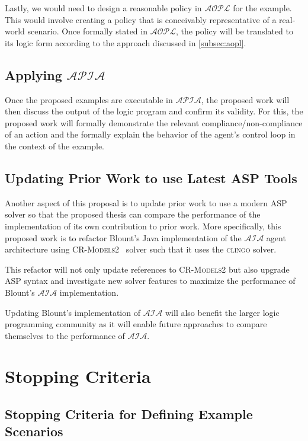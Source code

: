 Lastly, we would need to design a reasonable policy in $\mathcal{AOPL}$ for the example.
This would involve creating a policy that is conceivably representative of a real-world scenario.
Once formally stated in $\mathcal{AOPL}$, the policy will be translated to its logic form according to the approach discussed in \cref{subsec:aopl}.

\subsection{Applying $\mathcal{APIA}$}

Once the proposed examples are executable in $\mathcal{APIA}$, the proposed work will then discuss the output of the logic program and confirm its validity.
For this, the proposed work will formally demonstrate the relevant compliance/non-compliance of an action and the formally explain the behavior of the agent's control loop in the context of the example.

\subsection{Updating Prior Work to use Latest ASP Tools}

Another aspect of this proposal is to update prior work to use a modern ASP solver so that the proposed thesis can compare the performance of the implementation of its own contribution to prior work.
More specifically, this proposed work is to refactor Blount's Java implementation of the $\mathcal{AIA}$ agent architecture using \textsc{CR-Models2}~\citep{balduccini_cr-models_2007} solver such that it uses the \textsc{clingo} solver.

This refactor will not only update references to \textsc{CR-Models2} but also upgrade ASP syntax and investigate new solver features to maximize the performance of Blount's $\mathcal{AIA}$ implementation.

Updating Blount's implementation of $\mathcal{AIA}$ will also benefit the larger logic programming community as it will enable future approaches to compare themselves to the performance of $\mathcal{AIA}$.

\section{Stopping Criteria}

\subsection{Stopping Criteria for Defining Example Scenarios}

